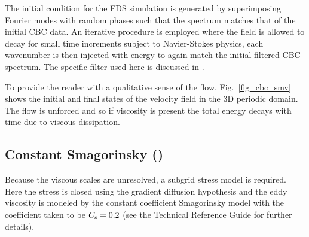 \documentclass[11pt]{book}
\begin{document}
The initial condition for the FDS simulation is generated by superimposing Fourier modes with random phases such that the spectrum matches that of the initial CBC data.  An iterative procedure is employed where the field is allowed to decay for small time increments subject to Navier-Stokes physics, each wavenumber is then injected with energy to again match the initial filtered CBC spectrum.  The specific filter used here is discussed in \cite{McDermott:2005b}.

To provide the reader with a qualitative sense of the flow, Fig.~\ref{fig_cbc_smv} shows the initial and final states of the velocity field in the 3D periodic domain.  The flow is unforced and so if viscosity is present the total energy decays with time due to viscous dissipation.

\subsection{Constant Smagorinsky (\texorpdfstring{}{csmag})}

Because the viscous scales are unresolved, a subgrid stress model is required. Here the stress is closed using the gradient diffusion hypothesis and the eddy viscosity is modeled by the constant coefficient Smagorinsky model with the coefficient taken to be $C_{\rm s} = 0.2$ (see the Technical Reference Guide for further details).
\end{document}
